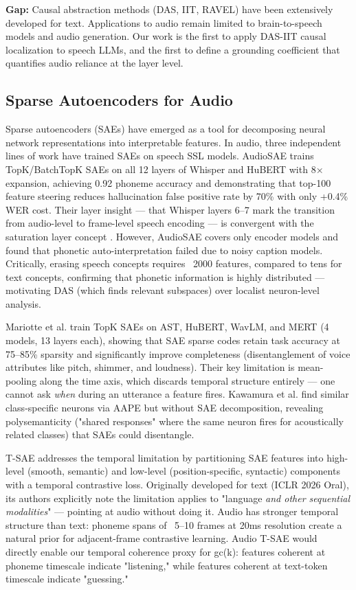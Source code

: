 \documentclass[a4paper]{article}
\begin{document}
\textbf{Gap:} Causal abstraction methods (DAS, IIT, RAVEL) have been extensively developed for text. Applications to audio remain limited to brain-to-speech models and audio generation. Our work is the first to apply DAS-IIT causal localization to speech LLMs, and the first to define a grounding coefficient that quantifies audio reliance at the layer level.

\subsection{Sparse Autoencoders for Audio}

Sparse autoencoders (SAEs) have emerged as a tool for decomposing neural network representations into interpretable features. In audio, three independent lines of work have trained SAEs on speech SSL models. AudioSAE \cite{aparin2026} trains TopK/BatchTopK SAEs on all 12 layers of Whisper and HuBERT with 8× expansion, achieving 0.92 phoneme accuracy and demonstrating that top-100 feature steering reduces hallucination false positive rate by 70\% with only +0.4\% WER cost. Their layer insight — that Whisper layers 6–7 mark the transition from audio-level to frame-level speech encoding — is convergent with the saturation layer concept \cite{glazer2025}. However, AudioSAE covers only encoder models and found that phonetic auto-interpretation failed due to noisy caption models. Critically, erasing speech concepts requires ~2000 features, compared to tens for text concepts, confirming that phonetic information is highly distributed — motivating DAS (which finds relevant subspaces) over localist neuron-level analysis.

Mariotte et al. \cite{ref2025} train TopK SAEs on AST, HuBERT, WavLM, and MERT (4 models, 13 layers each), showing that SAE sparse codes retain task accuracy at 75–85\% sparsity and significantly improve completeness (disentanglement of voice attributes like pitch, shimmer, and loudness). Their key limitation is mean-pooling along the time axis, which discards temporal structure entirely — one cannot ask \textit{when} during an utterance a feature fires. Kawamura et al. \cite{arxiv_2602.15307} find similar class-specific neurons via AAPE but without SAE decomposition, revealing polysemanticity ("shared responses" where the same neuron fires for acoustically related classes) that SAEs could disentangle.

T-SAE \cite{bhalla2025} addresses the temporal limitation by partitioning SAE features into high-level (smooth, semantic) and low-level (position-specific, syntactic) components with a temporal contrastive loss. Originally developed for text (ICLR 2026 Oral), its authors explicitly note the limitation applies to "language \textit{and other sequential modalities}" — pointing at audio without doing it. Audio has stronger temporal structure than text: phoneme spans of ~5–10 frames at 20ms resolution create a natural prior for adjacent-frame contrastive learning. Audio T-SAE would directly enable our temporal coherence proxy for gc(k): features coherent at phoneme timescale indicate "listening," while features coherent at text-token timescale indicate "guessing."
\end{document}
